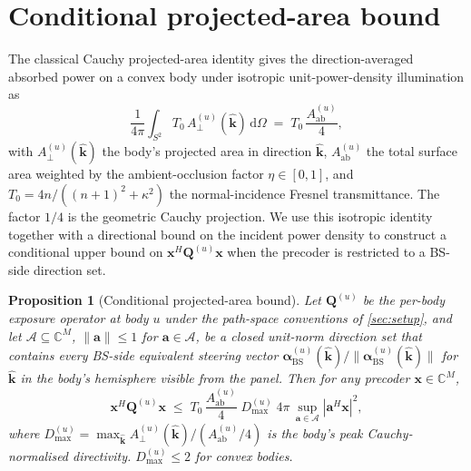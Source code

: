 \documentclass[journal,twocolumn,10pt]{IEEEtran}
\theoremstyle{plain}
\newtheorem{proposition}[theorem]{Proposition}
\theoremstyle{remark}
\newcommand{\khat}{\hat{\bm{k}}}
\newcommand{\xx}{\mathbf{x}}
\newcommand{\Aab}{A_{\mathrm{ab}}}
\newcommand{\Qmat}{\mathbf{Q}}
\newcommand{\diff}{\mathrm{d}}
\newcommand{\Complex}{\mathbb{C}}
\begin{document}
\section{Conditional projected-area bound}\label{app:cauchy}

The classical Cauchy projected-area identity gives the
direction-averaged absorbed power on a convex body under isotropic
unit-power-density illumination as
\begin{equation}\label{eq:cauchy-iso}
  \frac{1}{4\pi} \int_{S^2} T_0\,A_\perp^{(u)}(\khat)\,\diff\Omega
  \;=\; T_0\,\frac{\Aab^{(u)}}{4},
\end{equation}
with $A_\perp^{(u)}(\khat)$ the body's projected area in direction
$\khat$, $\Aab^{(u)}$ the total surface area weighted by the
ambient-occlusion factor $\eta \in [0,1]$, and $T_0 = 4n/((n+1)^2
+ \kappa^2)$ the normal-incidence Fresnel transmittance. The
factor $1/4$ is the geometric Cauchy projection. We use this
isotropic identity together with a directional bound on the
incident power density to construct a conditional upper bound on
$\xx^H \Qmat^{(u)} \xx$ when the precoder is restricted to a
BS-side direction set.

\begin{proposition}[Conditional projected-area bound]\label{thm:cauchy-cond}
Let $\Qmat^{(u)}$ be the per-body exposure operator at body $u$
under the path-space conventions of \cref{sec:setup}, and let
$\mathcal{A} \subseteq \Complex^M$, $\|\mathbf{a}\| \leq 1$ for
$\mathbf{a} \in \mathcal{A}$, be a closed unit-norm direction set
that contains every BS-side equivalent steering vector
$\bm\alpha_{\mathrm{BS}}^{(u)}(\khat)/\|\bm\alpha_{\mathrm{BS}}^{(u)}(\khat)\|$
for $\khat$ in the body's hemisphere visible from the panel. Then
for any precoder $\xx \in \Complex^M$,
\begin{equation}\label{eq:cauchy-cond}
  \xx^H \Qmat^{(u)} \xx \;\leq\; T_0\,
  \frac{\Aab^{(u)}}{4}\;D_{\max}^{(u)}\;
  4\pi\,\sup_{\mathbf{a} \in \mathcal{A}} |\mathbf{a}^H \xx|^2,
\end{equation}
where $D_{\max}^{(u)} = \max_{\khat} A_\perp^{(u)}(\khat)/
(\Aab^{(u)}/4)$ is the body's peak Cauchy-normalised directivity.
$D_{\max}^{(u)} \leq 2$ for convex bodies.
\end{proposition}
\end{document}
